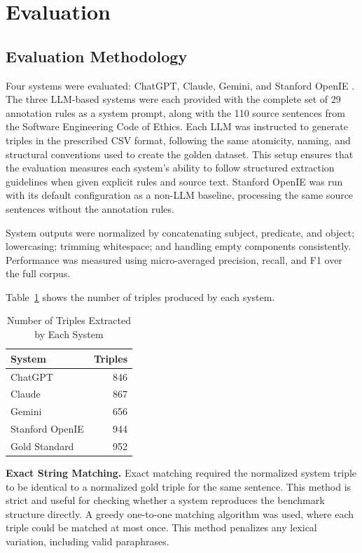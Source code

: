 \documentclass[conference]{IEEEtran}
\begin{document}
\section{Evaluation}

\subsection{Evaluation Methodology}
Four systems were evaluated: ChatGPT, Claude, Gemini, and Stanford OpenIE \cite{angeli2015leveraging}. The three LLM-based systems were each provided with the complete set of 29 annotation rules as a system prompt, along with the 110 source sentences from the Software Engineering Code of Ethics. Each LLM was instructed to generate triples in the prescribed CSV format, following the same atomicity, naming, and structural conventions used to create the golden dataset. This setup ensures that the evaluation measures each system's ability to follow structured extraction guidelines when given explicit rules and source text. Stanford OpenIE was run with its default configuration as a non-LLM baseline, processing the same source sentences without the annotation rules.

System outputs were normalized by concatenating subject, predicate, and object; lowercasing; trimming whitespace; and handling empty components consistently. Performance was measured using micro-averaged precision, recall, and F1 over the full corpus.

Table~\ref{tab:system_triples} shows the number of triples produced by each system.

\begin{table}[htbp]
\caption{Number of Triples Extracted by Each System}
\label{tab:system_triples}
\centering
\begin{tabular}{lr}
\toprule
\textbf{System} & \textbf{Triples} \\
\midrule
ChatGPT & 846 \\
Claude & 867 \\
Gemini & 656 \\
Stanford OpenIE & 944 \\
\midrule
Gold Standard & 952 \\
\bottomrule
\end{tabular}
\end{table}

\textbf{Exact String Matching.}
Exact matching required the normalized system triple to be identical to a normalized gold triple for the same sentence. This method is strict and useful for checking whether a system reproduces the benchmark structure directly. A greedy one-to-one matching algorithm was used, where each triple could be matched at most once. This method penalizes any lexical variation, including valid paraphrases.
\end{document}
